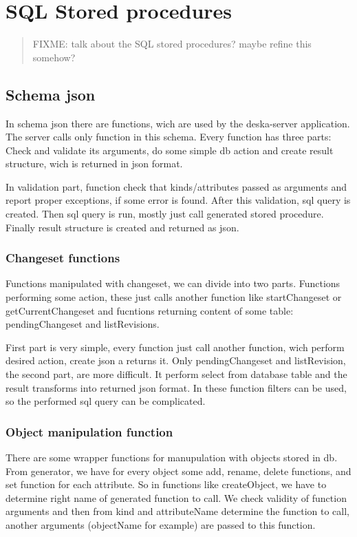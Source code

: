 \documentclass[deska]{subfiles}
\begin{document}
\chapter{SQL Stored procedures}
\label{sec:sql-procedures}

\begin{abstract}
FIXME: talk about the SQL stored procedures? maybe refine this somehow?
\end{abstract}

\section{Schema json}
In schema json there are functions, wich are used by the deska-server application. The server calls only function in this schema. Every function has three parts: Check and validate its arguments, do some simple db action and create result structure, wich is returned in json format.

In validation part, function check that kinds/attributes passed as arguments and report proper exceptions, if some error is found.
After this validation, sql query is created. Then sql query is run, mostly just call generated stored procedure. Finally result structure is created and returned as json.

\subsection{Changeset functions}
Functions manipulated with changeset, we can divide into two parts. Functions performing some action, these just calls another function like startChangeset or getCurrentChangeset and fucntions returning content of some table: pendingChangeset and listRevisions.

First part is very simple, every function just call another function, wich perform desired action, create json a returns it.
Only pendingChangeset and listRevision, the second part, are more difficult. It perform select from database table and the result transforms into returned json format. In these function filters can be used, so the performed sql query can be complicated.

\subsection{Object manipulation function}
There are some wrapper functions for manupulation with objects stored in db. From generator, we have for every object some add, rename, delete functions, and set function for each attribute. So in functions like createObject, we have to determine right name of generated function to call. We check validity of function arguments and then from kind and attributeName determine the function to call, another arguments (objectName for example) are passed to this function.
\end{document}
